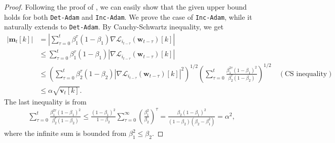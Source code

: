 \documentclass{article} %
\theoremstyle{plain}
\theoremstyle{definition}
\theoremstyle{remark}
\newcommand{\Ls}{\mathcal{L}}
\def\bm{{\mathbf m}}
\def\bw{{\mathbf w}}
\def\bv{{\mathbf v}}
\begin{document}
\begin{proof}
    Following the proof of \citet[Lemma A.2]{zou2023understanding}, we can easily show that the given upper bound holds for both \texttt{Det-Adam} and \texttt{Inc-Adam}. We prove the case of \texttt{Inc-Adam}, while it naturally extends to \texttt{Det-Adam}. By Cauchy-Schwartz inequality, we get
    \begin{align*}
        |\bm_t[k]|&=|\sum_{\tau=0}^t \beta_1^\tau (1-\beta_1)\nabla \Ls_{i_{t-\tau}}(\bw_{t-\tau})[k]| \\
        &\leq \sum_{\tau=0}^t \beta_1^\tau (1-\beta_1)|\nabla \Ls_{i_{t-\tau}}(\bw_{t-\tau})[k]| \\
        & \leq  \left(\sum_{\tau=0}^t \beta_2^\tau (1-\beta_2)|\nabla \Ls_{i_{t-\tau}}(\bw_{t-\tau})[k]|^2\right)^{1/2} \left(\sum_{\tau=0}^t \frac{\beta_1^{2\tau}(1-\beta_1)^2}{\beta_2^\tau(1-\beta_2)}\right)^{1/2} \quad (\text{CS inequality}) \\
        &\leq\alpha\sqrt{\bv_t[k]}.
    \end{align*}
    The last inequality is from 
    \begin{align*}
        \sum_{\tau=0}^t \frac{\beta_1^{2\tau}(1-\beta_1)^2}{\beta_2^\tau(1-\beta_2)} \leq \frac{(1-\beta_1)^2}{1-\beta_2} \sum_{\tau=0}^\infty\left(\frac{\beta_1^2}{\beta_2}\right)^\tau = \frac{\beta_2(1-\beta_1)^2}{(1-\beta_2)(\beta_2-\beta_1^2)} = \alpha^2,
    \end{align*}
    where the infinite sum is bounded from $\beta_1^2 \leq \beta_2$.
\end{proof}
\end{document}
